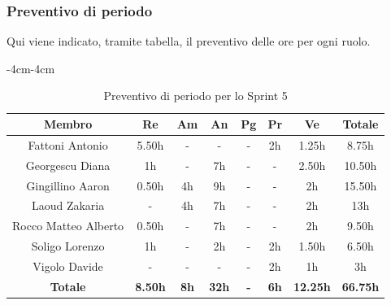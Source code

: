 \documentclass[a4paper,12pt]{article}
\begin{document}
\subsubsection{Preventivo di periodo}
Qui viene indicato, tramite tabella, il preventivo delle ore per ogni ruolo.
\begin{table}[H]
    \begin{adjustwidth}{-4cm}{-4cm}
    \centering
    \begin{tabular}{|c|c|c|c|c|c|c|c|}
        \hline
        \textbf{Membro}& \textbf{Re} & \textbf{Am} & \textbf{An} & \textbf{Pg} & \textbf{Pr} & \textbf{Ve} & \textbf{Totale} \\
        \hline
        Fattoni Antonio         & 5.50h     & -     & -     & -     & 2h    & 1.25h     & 8.75h \\
        \hline
        Georgescu Diana         & 1h        & -     & 7h    & -     & -     & 2.50h     & 10.50h \\
        \hline
        Gingillino Aaron        & 0.50h     & 4h    & 9h    & -     & -     & 2h        & 15.50h \\
        \hline
        Laoud Zakaria           & -         & 4h    & 7h    & -     & -     & 2h        & 13h\\
        \hline
        Rocco Matteo Alberto    & 0.50h     & -     & 7h    & -     & -     & 2h        & 9.50h \\
        \hline
        Soligo Lorenzo          & 1h        & -     & 2h    & -     & 2h    & 1.50h     & 6.50h \\
        \hline
        Vigolo Davide           & -         & -     & -     & -     & 2h    & 1h        & 3h \\
        \hline
        \textbf{Totale} & \textbf{8.50h} & \textbf{8h} & \textbf{32h} & \textbf{-} & \textbf{6h} & \textbf{12.25h} & \textbf{66.75h} \\
        \hline
    \end{tabular}
    \caption{Preventivo di periodo per lo Sprint 5}
    \end{adjustwidth}
\end{table}
\end{document}
